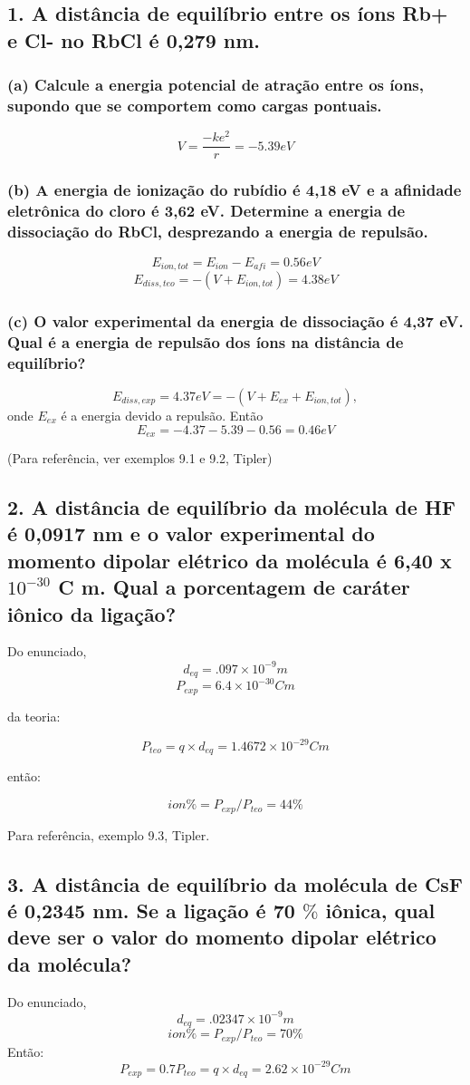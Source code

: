 \documentclass{article}
\begin{document}
\subsection{1. A distância de equilíbrio entre os íons Rb+ e Cl- no RbCl é 0,279 nm.}

\subsubsection{(a) Calcule a energia  potencial de atração entre os íons, supondo que se comportem como cargas pontuais. }
\[V = \frac{-k e^2}{r} = -5.39 eV\] 

\subsubsection{ (b) A energia de ionização do rubídio é 4,18 eV e a afinidade eletrônica do cloro é 3,62  eV. Determine a energia de dissociação do RbCl, desprezando a energia de repulsão. }
\[E_{ion, tot} = E_{ion}-E_{afi} = 0.56 eV\]
\[E_{diss, teo} = -(V + E_{ion, tot}) = 4.38 eV\]
\subsubsection{(c) O valor experimental da energia de dissociação é 4,37 eV. Qual é a energia de repulsão  dos íons na distância de equilíbrio?}
\[E_{diss, exp} = 4.37 eV = -(V+E_{ex} + E_{ion, tot} ),\]
onde $E_{ex}$ é a energia devido a repulsão. Então
\[E_{ex} = - 4.37 - 5.39 - 0.56 = 0.46 eV \]

(Para referência, ver exemplos 9.1 e 9.2, Tipler)

\subsection{2. A distância de equilíbrio da molécula de HF é 0,0917 nm e o valor experimental do  momento dipolar elétrico da molécula é 6,40 x $10^{-30}$ C m. Qual a porcentagem de  caráter iônico da ligação? }%
Do enunciado,
\[d_{eq}= .097 \times 10^{-9} m\]
\[P_{exp}= 6.4 \times 10^{-30} C m\]

da teoria:

\[P_{teo}= q \times d_{eq} = 1.4672 \times 10^{-29} C m\]

então:

\[ion \% = P_{exp}/P_{teo} = 44\%\]

Para referência, exemplo 9.3, Tipler.

\subsection{3. A distância de equilíbrio da molécula de CsF é 0,2345 nm. Se a ligação é 70 $\%$ iônica, qual deve ser o valor do momento dipolar elétrico da molécula?} %
Do enunciado,
\[d_{eq}= .02347 \times 10^{-9} m\]
\[ion \% = P_{exp}/P_{teo} = 70\%\]
Então:
\[P_{exp}= 0.7 P_{teo} = q \times d_{eq} = 2.62 \times  10^{-29} C m\]
\end{document}
